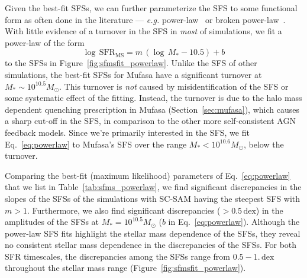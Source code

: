 \documentclass[preprint2,tighten]{aastex62}
\begin{document}
Given the best-fit SFSs, we can further parameterize the SFS to some 
functional form as often done in the literature --- \emph{e.g.} 
power-law~\citep{speagle2014} or broken power-law~\citep{lee2015}. With 
little evidence of a turnover in the SFS in {\em most} of simulations, 
we fit a power-law of the form 
\begin{equation} \label{eq:powerlaw}
\log\,\mathrm{SFR}_\mathrm{MS} = m\,(\log\,M_* - 10.5) + b
\end{equation}
to the SFSs in Figure~\ref{fig:sfmsfit_powerlaw}. Unlike the SFS of 
other simulations, the best-fit SFSs for {\sc Mufasa} have a significant 
turnover at $M_*{\sim}10^{10.5}M_\odot$. This turnover is \emph{not} 
caused by  misidentification of the SFS or some systematic effect of the 
fitting. {\color{red} Instead, the turnover is due to the halo mass 
dependent quenching prescription in {\sc Mufasa} (Section~\ref{sec:mufasa}), 
which causes a sharp cut-off in the SFS, in comparison to the other more 
self-consistent AGN feedback models. Since we're primarily interested in
the SFS, we fit Eq.~\ref{eq:powerlaw} to {\sc Mufasa}'s SFS over the range 
$M_*{<}10^{10.6} M_\odot$, below the turnover.} 

Comparing the best-fit (maximum likelihood) parameters of Eq.~\ref{eq:powerlaw}
that we list in Table~\ref{tab:sfms_powerlaw},  we find significant
discrepancies in the slopes of the SFSs of the simulations with SC-SAM 
having the steepest SFS with $m > 1$. Furthermore, we also find significant
discrepancies ($> 0.5\,\mathrm{dex}$) in the amplitudes of the SFSs at 
$M_* = 10^{10.5} M_\odot$ ($b$ in Eq.~\ref{eq:powerlaw}). Although the power-law
SFS fits highlight the stellar mass dependence of the SFSs, they reveal  
no consistent stellar mass dependence in the discrepancies of the SFSs. For 
both SFR timescales, the discrepancies among the SFSs range from $0.5 - 1.\,\mathrm{dex}$ 
throughout the stellar mass range (Figure~\ref{fig:sfmsfit_powerlaw}). 
\end{document}
